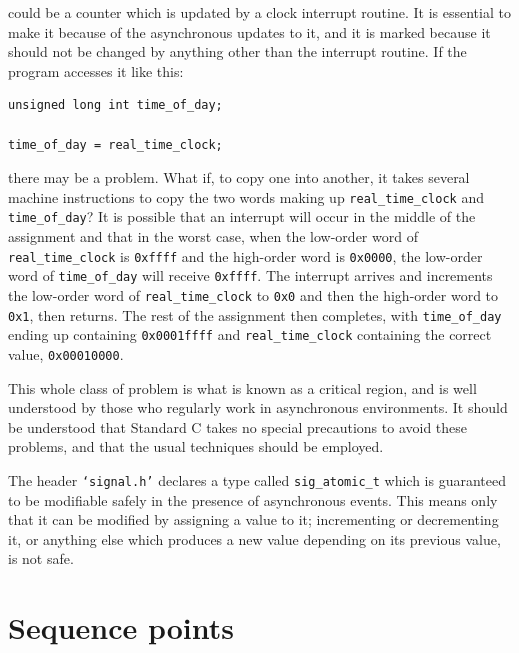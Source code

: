     could be a counter which is updated by a clock interrupt routine. It
     is essential to make it \volatile{} because of the
     asynchronous updates to it, and it is marked \const{} because
     it should not be changed by anything other than the interrupt routine.
     If the program accesses it like this:


\begin{Verbatim}
unsigned long int time_of_day;

time_of_day = real_time_clock;
\end{Verbatim}

    there may be a problem. What if, to copy one \klong{} into
     another, it takes several machine instructions to copy the two words
     making up \texttt{real\_time\_clock} and \texttt{time\_of\_day}? It
     is possible that an interrupt will occur in the middle of the
     assignment and that in the worst case, when the low-order word of
     \texttt{real\_time\_clock} is \texttt{0xffff} and the high-order
     word is \texttt{0x0000}, the low-order word of
     \texttt{time\_of\_day} will receive \texttt{0xffff}. The
     interrupt arrives and increments the low-order word of
     \texttt{real\_time\_clock} to \texttt{0x0} and then the
     high-order word to \texttt{0x1}, then returns. The rest of the
     assignment then completes, with \texttt{time\_of\_day} ending up
     containing \texttt{0x0001ffff} and \texttt{real\_time\_clock}
     containing the correct value, \texttt{0x00010000}.


    This whole class of problem is what is known as a critical region,
     and is well understood by those who regularly work in asynchronous
     environments. It should be understood that Standard C takes no special
     precautions to avoid these problems, and that the usual techniques
     should be employed.


    The header \texttt{`signal.h'} declares a type called
     \texttt{sig\_atomic\_t} which is guaranteed to be modifiable safely
     in the presence of asynchronous events. This means only that it can be
     modified by assigning a value to it; incrementing or decrementing it,
     or anything else which produces a new value depending on its previous
     value, is not safe.


   

  

 
        \section{Sequence points}
        

